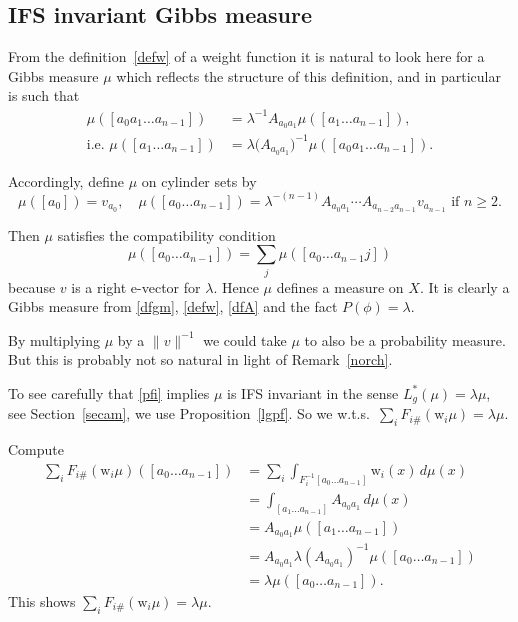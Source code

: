 \documentclass[a4paper]{amsart}
\theoremstyle{plain}
\theoremstyle{definition}
\theoremstyle{remark}
\begin{document}
 \subsection{IFS invariant Gibbs measure}  From the definition~\eqref{defw} of a weight function it is natural to look here for a Gibbs measure $ \mu $ which reflects the structure of this definition, and in particular is such that
\begin{equation} \label{pfi} 
\begin{aligned} 
   \mu([a_0a_1\dots a_{n-1} ]) &= \lambda ^{-1} A_{a_0a_1}\mu([a_1\dots a_{n-1}  ]) ,\\
  \text{i.e.\ } \mu([a_1\dots a_{n-1}  ]) &= \lambda \big(A_{a_0a_1}\big)^{-1} \mu([a_0a_1\dots a_{n-1} ]) .
\end{aligned}
\end{equation} 
  
  Accordingly, define $ \mu $ on cylinder sets by
 \begin{equation} \label{dfmu} 
 \mu([a_0]) = v_{a_0}, \quad 
  \mu([a_0\dots a_{n-1}])= \lambda ^{-(n-1)} A_{a_0a_1}\cdots A_{a_{n-2}a_{n-1}} v_{a_{n-1}}
  \text{ if } n\geq 2.
 \end{equation} 

Then  $ \mu $ satisfies the compatibility condition
  \[
   \mu([a_0\dots a_{n-1}]) = \sum_j   \mu([a_0\dots a_{n-1}j]) 
   \]
   because $ v $ is a right e-vector for $ \lambda $.  Hence $ \mu $ defines a measure on  $ X $.  It is clearly a Gibbs measure from \eqref{dfgm}, \eqref{defw}, \eqref{dfA} and the fact $ P(\phi) = \lambda $.  

By multiplying  $ \mu $ by a $ \|v\|^{-1} $  we could take  $ \mu$  to also be a probability measure.  But this is probably not so natural in light of Remark~\ref{norch}. 

\medskip To see carefully that \eqref{pfi} implies $ \mu $ is IFS invariant in the sense $ L^*_g(\mu) = \lambda \mu $, see Section~\ref{secam}, we use Proposition~\ref{lgpf}.  So we w.t.s.\ $ \sum_iF_{i\#}(\text{w}_i\mu) = \lambda \mu $.

Compute 
\begin{align*}
\sum_iF_{i\#}(\text{w}_i\mu) ([a_0\dots a_{n-1}]) 
   &=   \sum_i \int_{F_i^{-1}[a_0\dots a_{n-1}]}\text{w}_i(x)\, d\mu(x) \\
   &= \int_{[a_1\dots a_{n-1}]} A_{a_0a_1}\, d\mu(x) \\ 
   &= A_{a_0a_1} \mu([a_1\dots a_{n-1}]) \\
   &= A_{a_0a_1} \lambda (A_{a_0a_1})^{-1}\mu ([a_0\dots a_{n-1}]) \\
   &= \lambda \mu ([a_0\dots a_{n-1}]).
\end{align*} 
This shows $ \sum_iF_{i\#}(\text{w}_i\mu) = \lambda \mu $.
\end{document}
